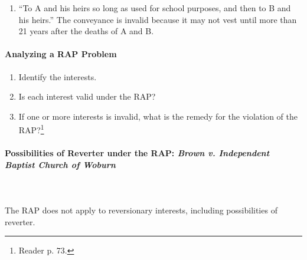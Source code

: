 \begin{enumerate}
    \item ``To A and his heirs so long as used for school purposes, and then 
    to B and his heirs.'' The conveyance is invalid because it may not vest 
    until more than 21 years after the deaths of A and B.
\end{enumerate}

\paragraph{Analyzing a RAP Problem}

\begin{enumerate}
    \item Identify the interests.
    \item Is each interest valid under the RAP?
    \item If one or more interests is invalid, what is the remedy for the 
    violation of the RAP?\footnote{Reader p. 73.}
\end{enumerate}

\paragraph{Possibilities of Reverter under the RAP: \emph{Brown v. Independent 
Baptist Church of Woburn}}
~\\\\
The RAP does not apply to reversionary interests, including possibilities of 
reverter.

